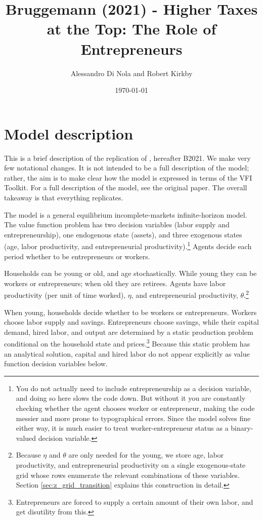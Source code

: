 \documentclass[11pt,fleqn]{article}
\begin{document}
\newcommand{\rob}[1]{{\noindent\color{blue}\bf #1}}
\newcommand{\robc}[1]{{\noindent\color{blue}\bf R: #1}}

\title{Bruggemann (2021) - Higher Taxes at the Top: The Role of Entrepreneurs}
\author{Alessandro Di Nola and Robert Kirkby}
\date{\today}
\maketitle


\section{Model description}
This is a brief description of the replication of \cite*{Bruggemann2021}, hereafter B2021. We make very few notational changes. It is not intended to be a full description of the model; rather, the aim is to make clear how the model is expressed in terms of the VFI Toolkit. For a full description of the model, see the original paper. The overall takeaway is that everything replicates.

The model is a general equilibrium incomplete-markets infinite-horizon model. The value function problem has two decision variables (labor supply and entrepreneurship), one endogenous state (assets), and three exogenous states (age, labor productivity, and entrepreneurial productivity).\footnote{You do not actually need to include entrepreneurship as a decision variable, and doing so here slows the code down. But without it you are constantly checking whether the agent chooses worker or entrepreneur, making the code messier and more prone to typographical errors. Since the model solves fine either way, it is much easier to treat worker-entrepreneur status as a binary-valued decision variable.} Agents decide each period whether to be entrepreneurs or workers.

Households can be young or old, and age stochastically. While young they can be workers or entrepreneurs; when old they are retirees. Agents have labor productivity (per unit of time worked), $\eta$, and entrepreneurial productivity, $\theta$.\footnote{Because $\eta$ and $\theta$ are only needed for the young, we store age, labor productivity, and entrepreneurial productivity on a single exogenous-state grid whose rows enumerate the relevant combinations of these variables. Section \ref{sec:z_grid_transition} explains this construction in detail.}

When young, households decide whether to be workers or entrepreneurs. Workers choose labor supply and savings. Entrepreneurs choose savings, while their capital demand, hired labor, and output are determined by a static production problem conditional on the household state and prices.\footnote{Entrepreneurs are forced to supply a certain amount of their own labor, and get disutility from this.} Because this static problem has an analytical solution, capital and hired labor do not appear explicitly as value function decision variables below.
\end{document}
